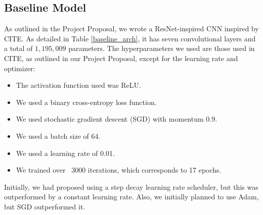 \documentclass{article} %
\begin{document}
\subsection{Baseline Model}

As outlined in the Project Proposal, we wrote a ResNet-inspired CNN inspired by CITE. As detailed in Table \ref{baseline_arch}, it has seven convolutional layers and a total of $1,195,009$ parameters. The hyperparameters we used are those used in CITE, as outlined in our Project Proposal, except for the learning rate and optimizer:
\begin{itemize}
    \item The activation function used was ReLU.
    \item We used a binary cross-entropy loss function.
    \item We used stochastic gradient descent (SGD) with momentum 0.9.
    \item We used a batch size of 64.
    \item We used a learning rate of 0.01.
    \item We trained over ~3000 iterations, which corresponds to 17 epochs.
\end{itemize}

Initially, we had proposed using a step decay learning rate scheduler, but this was outperformed by a constant learning rate. Also, we initially planned to use Adam, but SGD outperformed it.
\end{document}
